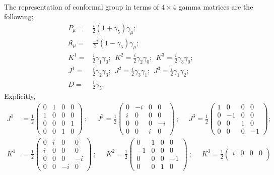\documentclass[]{article}
\numberwithin{equation}{section}
\begin{document}
{{\\

The representation of conformal group in terms of $4\times4$ gamma matrices are the following;
\begin{align}
    P_\mu=&\frac{i}{2}(1+\gamma_5)\gamma_\mu;\\
    \mathfrak{K}_\mu=&\frac{-i}{2}(1-\gamma_5)\gamma_\mu;\\
    K^1=&\frac{i}{2}\gamma_1\gamma_0;~~K^2=\frac{i}{2}\gamma_2\gamma_0;~~K^3=\frac{i}{2}\gamma_3\gamma_0;\\
    J^1=&\frac{i}{2}\gamma_2\gamma_3;~~J^2=\frac{i}{2}\gamma_3\gamma_1;~~J^3=\frac{i}{2}\gamma_1\gamma_2;\\
    D=&\frac{i}{2}\gamma_5.
\end{align}
Explicitly,
\begin{align*}
    J^{1}&=\frac{1}{2}\begin{pmatrix}
    0&1&0&0\\
    1&0&0&0\\
    0&0&0&1\\
    0&0&1&0
    \end{pmatrix}~;~~~~~~J^{2}=\frac{1}{2}\begin{pmatrix}
    0&-i&0&0\\
    i&0&0&0\\
    0&0&0&-i\\
    0&0&i&0
    \end{pmatrix}~;~~~~~~J^{3}=\frac{1}{2}\begin{pmatrix}
    1&0&0&0\\
    0&-1&0&0\\
    0&0&1&0\\
    0&0&0&-1
    \end{pmatrix};\\
    K^{1}&=\frac{1}{2}\begin{pmatrix}
    0&i&0&0\\
    i&0&0&0\\
    0&0&0&-i\\
    0&0&-i&0
    \end{pmatrix}~;~~~~~~K^{2}=\frac{1}{2}\begin{pmatrix}
    0&1&0&0\\
    -1&0&0&0\\
    0&0&0&-1\\
    0&0&1&0
    \end{pmatrix}~;~~~~~~K^{3}=\frac{1}{2}\begin{pmatrix}
    i&0&0&0\\

\end{pmatrix}
\end{align*}}}
\end{document}
